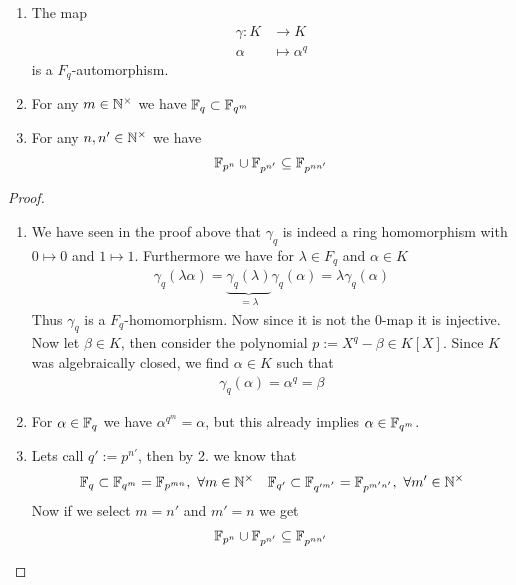 \documentclass[]{article}
\begin{document}
\begin{theorem*}
\begin{enumerate}
    \item The map
    \begin{align*}
        \gamma: K &\rightarrow K \\
                \alpha &\mapsto \alpha^q
    \end{align*}
    is a \(F_q\)-automorphism.
    \item For any \(m \in {\mathbb{N}}^\times \) we have \({\mathbb{F}}_q \subset {\mathbb{F}}_{q^m}\)
    \item For any \(n, n' \in {\mathbb{N}}^\times\) we have
    \begin{align}
        {\mathbb{F}}_{p^n} \cup {\mathbb{F}}_{p^{n'}} \subseteq {\mathbb{F}}_{p^{n n'}} 
        \label{eq:bodyrelations}
    \end{align}
\end{enumerate}
\end{theorem*}
\begin{proof}
\begin{enumerate}
    \item     We have seen in the proof above that \(\gamma_q\) is indeed a ring homomorphism with \(0 \mapsto 0\) and \(1 \mapsto 1\).
    Furthermore we have for \(\lambda \in F_q\) and \(\alpha \in K\)
    \begin{align*}
        \gamma_q(\lambda \alpha) = \underbrace{\gamma_q(\lambda)}_{=\lambda} \gamma_q(\alpha) = \lambda \gamma_q(\alpha)
    \end{align*}
    Thus \(\gamma_q\) is a \(F_q\)-homomorphism.
    Now since it is not the \(0\)-map it is injective. Now let \(\beta \in K\), then consider the polynomial \(p:=X^q-\beta \in K[X]\). 
    Since \(K\) was algebraically closed, we find \(\alpha \in K\) such that 
    \begin{align*}
        \gamma_q(\alpha)=\alpha^q= \beta
    \end{align*}
    \item For \(\alpha \in {\mathbb{F}}_q\) we have \(\alpha^{q^m}= \alpha\), but this already implies \(\alpha \in {\mathbb{F}}_{q^m}\).
    \item Lets call \(q':=p^{n'}\), then by 2. we know that 
    \begin{align*}
        &{\mathbb{F}}_q \subset {\mathbb{F}}_{q^m} = {\mathbb{F}}_{p^{mn}}, \ \forall m \in {\mathbb{N}}^\times &{\mathbb{F}}_{q'} \subset {\mathbb{F}}_{q'^{m'}}= {\mathbb{F}}_{p^{m'n'}}, \ \forall m' \in {\mathbb{N}}^\times
    \end{align*}
    Now if we select \(m=n'\) and \(m'=n\) we get 
    \begin{align*}
        {\mathbb{F}}_{p^n} \cup {\mathbb{F}}_{p^{n'}} \subseteq {\mathbb{F}}_{p^{n n'}}
    \end{align*}
\end{enumerate}
\end{proof}
\end{document}
